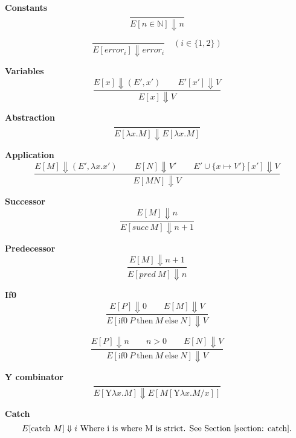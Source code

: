 \documentclass[12pt,a4paper]{report}
\theoremstyle{definition}
\theoremstyle{remark}
\begin{document}
\textbf{Constants}
\begin{equation}
    \frac{}{E[n\in\mathbb{N}] \Downarrow n}
\end{equation}

\begin{equation}
    \frac{}{E[error_i] \Downarrow error_i}\quad(i \in \{1,2\})
\end{equation}

\textbf{Variables}
\begin{equation}
    \frac{E[x] \Downarrow (E', x') \quad\quad E'[x'] \Downarrow V}{E[x] \Downarrow V}
\end{equation}

\textbf{Abstraction}
\begin{equation}
    \frac{}{E[\lambda x. M] \Downarrow E[\lambda x. M]}
\end{equation}

\textbf{Application}
\begin{equation}
    \frac{E[M] \Downarrow (E', \lambda x. x') \quad\quad  E[N] \Downarrow V' \quad\quad E'\cup \{x\mapsto V'\}[x'] \Downarrow V}{E[MN] \Downarrow V}
\end{equation}

\textbf{Successor}
\begin{equation}
    \frac{E[M] \Downarrow n}{E[succ\ M] \Downarrow n + 1}
\end{equation}

\textbf{Predecessor}
\begin{equation}
    \frac{E[M] \Downarrow n + 1}{E[pred\ M] \Downarrow n}
\end{equation}

\textbf{If0}
\begin{equation}
    \frac{E[P] \Downarrow 0 \quad\quad E[M] \Downarrow V}{E[\text{if0}\ P\ \text{then}\ M\ \text{else}\ N] \Downarrow V}
\end{equation}

\begin{equation}
    \frac{E[P] \Downarrow n \quad\quad n > 0 \quad\quad E[N] \Downarrow V}{E[\text{if0}\ P\ \text{then}\ M\ \text{else}\ N] \Downarrow V}
\end{equation}

\textbf{Y combinator}
\begin{equation}
    \frac{}{E[\text{Y} \lambda x. M] \Downarrow E[M[\text{Y} \lambda x. M / x]]}
\end{equation}


\textbf{Catch}
\begin{equation}
    E[\text{catch}\ M] \Downarrow i \text{ Where i is where M is strict. See Section \ref{section: catch}.}
\end{equation}
\end{document}

